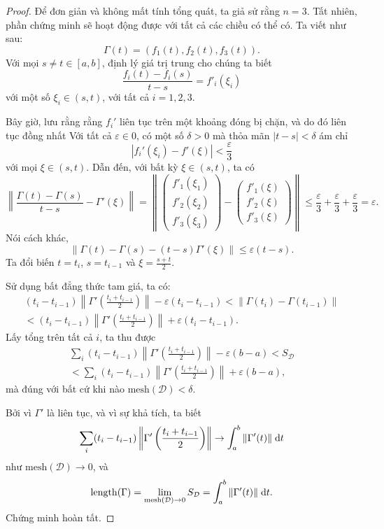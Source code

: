\begin{proof}
  Để đơn giản và không mất tính tổng quát, ta giả sử rằng $n = 3$. Tất nhiên, phần chứng minh sẽ hoạt động được với tất cả các chiều có thể có. Ta viết như sau:
  \[
    \Gamma(t) = (f_1(t), f_2(t), f_3(t)).
  \]
  Với mọi $s \not= t \in [a, b]$, định lý giá trị trung cho chúng ta biết
  \[
    \frac{f_i(t) - f_i(s)}{t - s} = f'_i (\xi_i)
  \]
  với một số $\xi_i \in (s, t)$, với tất cả $i = 1, 2, 3$.

  Bây giờ, lưu rằng rằng $f_i'$ liên tục trên một khoảng đóng bị chặn, và do đó liên tục đồng nhất
  Với tất cả $\varepsilon \in 0$, có một số $\delta > 0$ mà thỏa mãn $|t - s| < \delta$ ám chỉ
  \[
    |f_i'(\xi_i) - f'(\xi)| < \frac{\varepsilon}{3}
  \]
  với mọi $\xi \in (s, t)$. Dẫn đến, với bất kỳ $\xi \in (s, t)$, ta có
  \[
    \left\|\frac{\Gamma(t) - \Gamma(s)}{t - s} - \Gamma'(\xi)\right\| = \left\|\begin{pmatrix}f'_1(\xi_1)\\ f'_2(\xi_2)\\ f'_3(\xi_3)\end{pmatrix} - \begin{pmatrix}f'_1(\xi)\\ f'_2(\xi)\\ f'_3(\xi)\end{pmatrix}\right\| \leq \frac{\varepsilon}{3} + \frac{\varepsilon}{3} + \frac{\varepsilon}{3} = \varepsilon.
  \]
  Nói cách khác,
  \[
    \|\Gamma(t) - \Gamma(s) - (t - s) \Gamma'(\xi)\| \leq \varepsilon(t - s).
  \]
  Ta đổi biến $t = t_i$, $s = t_{i - 1}$ và $\xi = \frac{s + t}{2}$.

  Sử dụng bất đẳng thức tam giá, ta có:
  \begin{multline*}
    (t_i - t_{i - 1}) \left\|\Gamma'\left(\frac{t_i + t_{i - 1}}{2}\right)\right\| - \varepsilon(t_i - t_{i - 1}) < \|\Gamma(t_i) - \Gamma(t_{i - 1})\| \\
    < (t_i - t_{i - 1}) \left\|\Gamma'\left(\frac{t_i + t_{i - 1}}{2}\right)\right\| + \varepsilon(t_i - t_{i - 1}).
  \end{multline*}
  Lấy tổng trên tất cả $i$, ta thu được
  \begin{multline*}
    \sum_i (t_i - t_{i - 1}) \left\|\Gamma'\left(\frac{t_i + t_{i - 1}}{2}\right)\right\| - \varepsilon(b - a) < S_{\mathcal{D}}\\
    < \sum_i (t_i - t_{i - 1}) \left\|\Gamma'\left(\frac{t_i + t_{i - 1}}{2}\right)\right\| + \varepsilon(b - a),
  \end{multline*}
  mà đúng với bất cứ khi nào $\mathrm{mesh}(\mathcal{D}) < \delta$.

  Bởi vì $\Gamma'$ là liên tục, và vì sự khả tích, ta biết
  \[
    \sum_i (t_i - t_{i - 1}) \left\|\Gamma'\left(\frac{t_i + t_{i - 1}}{2}\right)\right\| \to \int_a^b \|\Gamma'(t)\|\;\mathrm{d} t
  \]
  như $\mathrm{mesh}(\mathcal{D}) \to 0$, và
  \[
    \operatorname{length}(\Gamma) = \lim_{\mathrm{mesh}(\mathcal{D}) \to 0} S_\mathcal{D} = \int_a^b \|\Gamma'(t)\|\;\mathrm{d} t.\qedhere
  \]
  Chứng minh hoàn tất.
\end{proof}